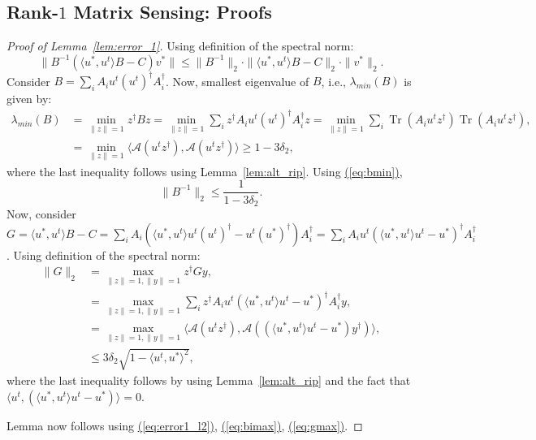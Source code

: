 \documentclass[11pt]{article}
\renewcommand{\eqref}[1]{\hyperref[#1]{(\ref*{#1})}}
\theoremstyle{plain}
\theoremstyle{definition}
\newcommand{\Tr}{\operatorname{Tr}}
\newcommand{\aff}{{\mathcal A}}
\newcommand{\ut}{u^t}
\newcommand{\utt}{(u^t)^\dag }
\newcommand{\uo}{u^* }
\newcommand{\uot}{(u^*)^\dag }
\newcommand{\vo}{v^* }
\newcommand{\Ait}{A_i^\dag }
\newcommand{\ip}[2]{\langle #1, #2 \rangle}
\begin{document}
\subsection{Rank-$1$ Matrix Sensing: Proofs}\label{app:sensing1}
\begin{proof}[Proof of Lemma~\ref{lem:error_1}]
Using definition of the spectral norm: 
\begin{equation}\label{eq:error1_l2}\|B^{-1}\left(\ip{\uo}{\ut}B-C\right)\vo\|\leq \|B^{-1}\|_2\cdot \|\ip{\uo}{\ut}B-C\|_2\cdot \|\vo\|_2.\end{equation}
Consider $B=\sum_i A_i \ut \utt \Ait$. Now, smallest eigenvalue of $B$, i.e., $\lambda_{min}(B)$ is given by: 
\begin{align}
\lambda_{min}(B)&=\min_{\|z\|=1}z^\dag B z=\min_{\|z\|=1} \sum_i z^\dag A_i \ut \utt \Ait z=\min_{\|z\|=1} \sum_i \Tr(A_i \ut z^\dag) \Tr(A_i \ut z^\dag),\nonumber\\
&=\min_{\|z\|=1} \ip{\aff(\ut z^\dag)}{\aff(\ut z^\dag)}\geq 1-3\delta_{2},\label{eq:bmin}
\end{align}
where the last inequality follows using Lemma~\ref{lem:alt_rip}. 
Using \eqref{eq:bmin}, \begin{equation}\|B^{-1}\|_2\leq \frac{1}{1-3\delta_2}.\label{eq:bimax}\end{equation}
\noindent Now, consider $G=\ip{\uo}{\ut}B-C=\sum_i A_i \left(\ip{\uo}{\ut}\ut\utt-\ut\uot\right)\Ait=\sum_i A_i \ut\left(\ip{\uo}{\ut}\ut-\uo\right)^\dag\Ait$. Using definition of the spectral norm: 
\begin{align}
  \|G\|_2&=\max_{\|z\|=1, \|y\|=1} z^\dag G y, \nonumber\\
&=\max_{\|z\|=1, \|y\|=1} \sum_i z^\dag A_i \ut \left(\ip{\uo}{\ut}\ut-\uo\right)^\dag\Ait y, \nonumber\\
&=\max_{\|z\|=1, \|y\|=1} \ip{\aff(\ut z^\dag)}{\aff\left( \left(\ip{\uo}{\ut}\ut-\uo\right) y^\dag\right)}, \nonumber\\
&\leq 3\delta_2\sqrt{1-\ip{\ut}{\uo}^2},\label{eq:gmax}
\end{align}
where the last inequality follows by using Lemma~\ref{lem:alt_rip} and the fact that $\ip{\ut}{\left(\ip{\uo}{\ut}\ut-\uo\right)}=0$. 

Lemma now follows using \eqref{eq:error1_l2}, \eqref{eq:bimax}, \eqref{eq:gmax}. 
\end{proof}
\end{document}
